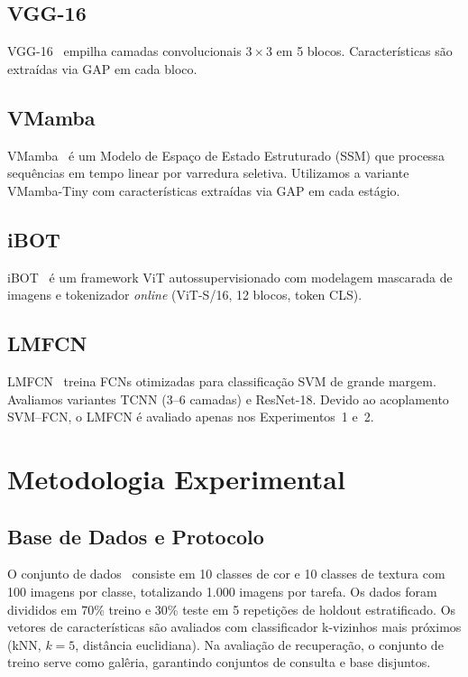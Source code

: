 \documentclass[conference]{IEEEtran}
\begin{document}
\subsection{VGG-16}

VGG-16~\cite{b7} empilha camadas convolucionais $3{\times}3$ em 5 blocos.
Caracter\'{i}sticas s\~{a}o extra\'{i}das via GAP em cada bloco.

\subsection{VMamba}

VMamba~\cite{b16} \'{e} um Modelo de Espa\c{c}o de Estado Estruturado
(SSM) que processa sequ\^{e}ncias em tempo linear por varredura seletiva.
Utilizamos a variante VMamba-Tiny com caracter\'{i}sticas extra\'{i}das
via GAP em cada est\'{a}gio.

\subsection{iBOT}

iBOT~\cite{b17} \'{e} um framework ViT autossupervisionado com
modelagem mascarada de imagens e tokenizador \textit{online}
(ViT-S/16, 12 blocos, token CLS).

\subsection{LMFCN}

LMFCN~\cite{b28} treina FCNs otimizadas para classifica\c{c}\~{a}o SVM
de grande margem.
Avaliamos variantes TCNN (3--6 camadas) e ResNet-18.
Devido ao acoplamento SVM--FCN, o LMFCN \'{e} avaliado apenas nos
Experimentos~1 e~2.

\section{Metodologia Experimental}

\subsection{Base de Dados e Protocolo}

O conjunto de dados~\cite{b2} consiste em 10 classes de cor e 10 classes
de textura com 100 imagens por classe, totalizando 1.000 imagens por
tarefa.
Os dados foram divididos em 70\% treino e 30\% teste em 5 repeti\c{c}\~{o}es
de holdout estratificado.
Os vetores de caracter\'{i}sticas s\~{a}o avaliados com classificador
k-vizinhos mais pr\'{o}ximos (kNN, $k=5$, dist\^{a}ncia euclidiana).
Na avalia\c{c}\~{a}o de recupera\c{c}\~{a}o, o conjunto de treino serve
como gal\^{e}ria, garantindo conjuntos de consulta e base disjuntos.
\end{document}
